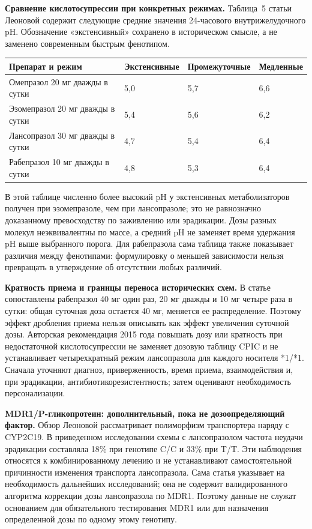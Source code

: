 \documentclass[11pt,a4paper,notitlepage]{report}
\newcommand{\src}[1]{\unskip\space\cite{#1}}
\begin{document}
\textbf{Сравнение кислотосупрессии при конкретных режимах.} Таблица~5 статьи Леоновой содержит следующие средние значения 24-часового внутрижелудочного pH. Обозначение «экстенсивный» сохранено в историческом смысле, а не заменено современным быстрым фенотипом.\src{leonova2015}
\begin{longtable}{P{0.34\textwidth}P{0.18\textwidth}P{0.18\textwidth}P{0.18\textwidth}}
\toprule
Препарат и режим & Экстенсивные & Промежуточные & Медленные \\
\midrule
\endhead
Омепразол 20 мг дважды в сутки & 5,0 & 5,7 & 6,6 \\
Эзомепразол 20 мг дважды в сутки & 5,4 & 5,6 & 6,2 \\
Лансопразол 30 мг дважды в сутки & 4,7 & 5,4 & 6,4 \\
Рабепразол 10 мг дважды в сутки & 4,8 & 5,3 & 6,4 \\
\bottomrule
\end{longtable}
В этой таблице численно более высокий pH у экстенсивных метаболизаторов получен при эзомепразоле, чем при лансопразоле; это не равнозначно доказанному превосходству по заживлению или эрадикации. Дозы разных молекул неэквивалентны по массе, а средний pH не заменяет время удержания pH выше выбранного порога. Для рабепразола сама таблица также показывает различия между фенотипами: формулировку о меньшей зависимости нельзя превращать в утверждение об отсутствии любых различий.\src{leonova2015}

\textbf{Кратность приема и границы переноса исторических схем.} В статье сопоставлены рабепразол 40 мг один раз, 20 мг дважды и 10 мг четыре раза в сутки: общая суточная доза остается 40 мг, меняется ее распределение. Поэтому эффект дробления приема нельзя описывать как эффект увеличения суточной дозы. Авторская рекомендация 2015 года повышать дозу или кратность при недостаточной кислотосупрессии не заменяет дозовую таблицу CPIC и не устанавливает четырехкратный режим лансопразола для каждого носителя *1/*1. Сначала уточняют диагноз, приверженность, время приема, взаимодействия и, при эрадикации, антибиотикорезистентность; затем оценивают необходимость персонализации.\src{leonova2015,cpic,acghp}

\textbf{MDR1/P-гликопротеин: дополнительный, пока не дозоопределяющий фактор.} Обзор Леоновой рассматривает полиморфизм транспортера наряду с CYP2C19. В приведенном исследовании схемы с лансопразолом частота неудачи эрадикации составляла 18\% при генотипе C/C и 33\% при T/T. Эти наблюдения относятся к комбинированному лечению и не устанавливают самостоятельной причинности изменения транспорта лансопразола. Сама статья указывает на необходимость дальнейших исследований; она не содержит валидированного алгоритма коррекции дозы лансопразола по MDR1. Поэтому данные не служат основанием для обязательного тестирования MDR1 или для назначения определенной дозы по одному этому генотипу.\src{leonova2015}
\end{document}
